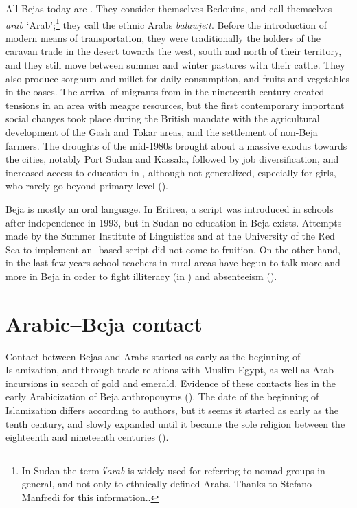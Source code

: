 \documentclass[output=paper]{langsci/langscibook}
\begin{document}
All Bejas today are . They consider themselves Bedouins, and call themselves \textit{arab} ‘Arab’;\footnote{In Sudan the term \textit{ʕarab} is widely used for referring to nomad groups in general, and not only to ethnically defined Arabs. Thanks to Stefano Manfredi for this information..} they call the ethnic Arabs \textit{balawjeːt}. Before the introduction of modern means of transportation, they were traditionally the holders of the caravan trade in the desert towards the west, south and north of their territory, and they still move between summer and winter pastures with their cattle. They also produce sorghum and millet for daily consumption, and fruits and vegetables in the oases. The arrival of  migrants from  in the nineteenth century created tensions in an area with meagre resources, but the first contemporary important social changes took place during the British mandate with the agricultural development of the Gash and Tokar areas, and the settlement of non-Beja farmers. The droughts of the mid-1980s brought about a massive exodus towards the cities, notably Port Sudan and Kassala, followed by job diversification, and increased access to education in , although not generalized, especially for girls, who rarely go beyond primary level (\citealt{HamidAhmed2005book}).

Beja is mostly an oral language. In Eritrea, a  script was introduced in schools after independence in 1993, but in Sudan no education in Beja exists. Attempts made by the Summer Institute of Linguistics and at the University of the Red Sea to implement an -based script did not come to fruition. On the other hand, in the last few years school teachers in rural areas have begun to talk more and more in Beja in order to fight illiteracy (in ) and absenteeism (\citealt{Onour2015}).

\section{Arabic--Beja contact}

Contact between Bejas and Arabs started as early as the beginning of Islamization, and through trade relations with Muslim Egypt, as well as Arab incursions in search of gold and emerald. Evidence of these contacts lies in the early Arabicization of Beja anthroponyms (\citealt{Záhořík2007}). The date of the beginning of Islamization differs according to authors, but it seems it started as early as the tenth century, and slowly expanded until it became the sole religion between the eighteenth and nineteenth centuries (\citealt{Záhořík2007}).
\end{document}
